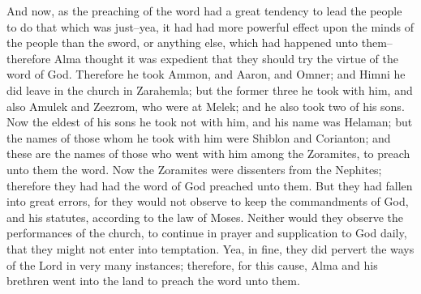 And now, as the preaching of the word had a great tendency to lead the people to do that which was just--yea, it had had more powerful effect upon the minds of the people than the sword, or anything else, which had happened unto them--therefore Alma thought it was expedient that they should try the virtue of the word of God.
\bverse \iffalse Therefore he took Ammon, and Aaron, and Omner; and Himni he did leave in the church in Zarahemla; but the former three he took with him, and also Amulek and Zeezrom, who were at Melek; and he also took two of his sons. \fi
Therefore he took Ammon, and Aaron, and Omner; and Himni he did leave in the church in Zarahemla; but the former three he took with him, and also Amulek and Zeezrom, who were at Melek; and he also took two of his sons.
\bverse \iffalse Now the eldest of his sons he took not with him, and his name was Helaman; but the names of those whom he took with him were Shiblon and Corianton; and these are the names of those who went with him among the Zoramites, to preach unto them the word. \fi
Now the eldest of his sons he took not with him, and his name was Helaman; but the names of those whom he took with him were Shiblon and Corianton; and these are the names of those who went with him among the Zoramites, to preach unto them the word.
\bverse \iffalse Now the Zoramites were dissenters from the Nephites; therefore they had had the word of God preached unto them. \fi
Now the Zoramites were dissenters from the Nephites; therefore they had had the word of God preached unto them.
\bverse \iffalse But they had fallen into great errors, for they would not observe to keep the commandments of God, and his statutes, according to the law of Moses. \fi
But they had fallen into great errors, for they would not observe to keep the commandments of God, and his statutes, according to the law of Moses.
\bverse \iffalse Neither would they observe the performances of the church, to continue in prayer and supplication to God daily, that they might not enter into temptation. \fi
Neither would they observe the performances of the church, to continue in prayer and supplication to God daily, that they might not enter into temptation.
\bverse \iffalse Yea, in fine, they did pervert the ways of the Lord in very many instances; therefore, for this cause, Alma and his brethren went into the land to preach the word unto them. \fi
Yea, in fine, they did pervert the ways of the Lord in very many instances; therefore, for this cause, Alma and his brethren went into the land to preach the word unto them.
